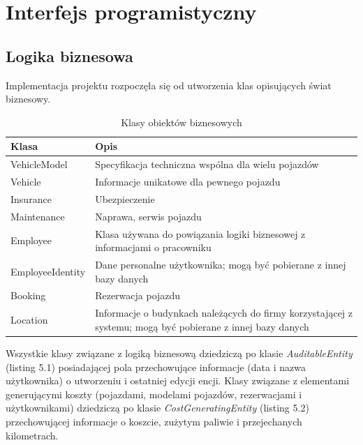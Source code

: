 \documentclass[eng,printmode,openany]{mgr}
\begin{document}
	\newpage
	\section{Interfejs programistyczny}
	\subsection{Logika biznesowa}
	Implementacja projektu rozpoczęła się od utworzenia klas opisujących świat biznesowy.
	\begin{table}[H]
		\caption{Klasy obiektów biznesowych}
		\begin{tabularx}{\textwidth}{|l|X|}
			\hline
			\textbf{Klasa}   & \textbf{Opis}                                                                                              \\ \hline
			VehicleModel     & Specyfikacja techniczna wspólna dla wielu pojazdów                                                         \\ \hline
			Vehicle          & Informacje unikatowe dla pewnego pojazdu                                                                   \\ \hline
			Insurance        & Ubezpieczenie                                                                                              \\ \hline
			Maintenance      & Naprawa, serwis pojazdu                                                                                    \\ \hline
			Employee         & Klasa używana do powiązania logiki biznesowej z informacjami o pracowniku                                  \\ \hline
			EmployeeIdentity & Dane personalne użytkownika; mogą być pobierane z innej bazy danych                                        \\ \hline
			Booking          & Rezerwacja pojazdu                                                                                         \\ \hline
			Location         & Informacje o budynkach należących do firmy korzystającej z systemu; mogą być pobierane z innej bazy danych \\ \hline
		\end{tabularx}
	\end{table}
	
	Wszystkie klasy związane z logiką biznesową dziedziczą po klasie \textit{AuditableEntity} (listing 5.1) posiadającej pola przechowujące informacje (data i nazwa użytkownika) o utworzeniu i ostatniej edycji encji. Klasy związane z elementami generującymi koszty (pojazdami, modelami pojazdów, rezerwacjami i użytkownikami) dziedziczą po klasie \newline \textit{CostGeneratingEntity} (listing 5.2) przechowującej informacje o koszcie, zużytym paliwie i przejechanych kilometrach.
	
\end{document}
